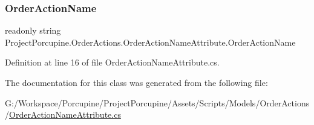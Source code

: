 \subsubsection{\texorpdfstring{Order\+Action\+Name}{OrderActionName}}
{\footnotesize\ttfamily readonly string Project\+Porcupine.\+Order\+Actions.\+Order\+Action\+Name\+Attribute.\+Order\+Action\+Name}



Definition at line 16 of file Order\+Action\+Name\+Attribute.\+cs.



The documentation for this class was generated from the following file\+:\begin{DoxyCompactItemize}
\item 
G\+:/\+Workspace/\+Porcupine/\+Project\+Porcupine/\+Assets/\+Scripts/\+Models/\+Order\+Actions/\hyperlink{_order_action_name_attribute_8cs}{Order\+Action\+Name\+Attribute.\+cs}\end{DoxyCompactItemize}
